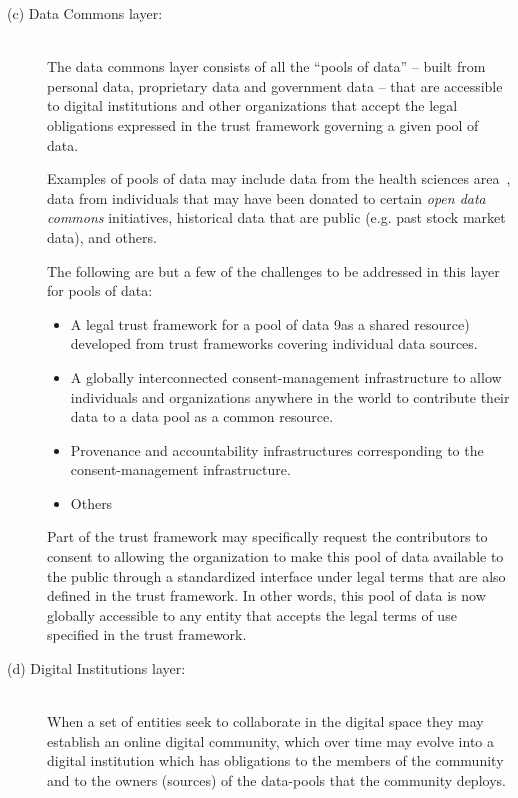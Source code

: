 \begin{description}
\item[(c) Data Commons layer:]~\\
The data commons layer consists of all the ``pools of data''
-- built from personal data, proprietary data and government data --
that are accessible to digital institutions and
other organizations that accept the legal obligations
expressed in the trust framework governing a given pool of data.

Examples of pools of data may include data from the health sciences area~\cite{pentland2009using},
data from individuals that may have been donated
to certain {\em open data commons} initiatives,
historical data that are public (e.g. past stock market data),
and others.

The following are but a few of the challenges to be addressed
in this layer for pools of data:
\begin{itemize}
\item  A legal trust framework for a pool of data 9as a shared resource) developed
from trust frameworks covering individual data sources.

\item  A globally interconnected consent-management infrastructure
to allow individuals and organizations anywhere in the world
to contribute their data to a data pool as a common resource.

\item  Provenance and accountability infrastructures corresponding 
to the consent-management infrastructure.

\item  Others
\end{itemize}


Part of the trust framework may specifically
request the contributors to consent
to allowing the organization
to make this pool of data available to the public
through a standardized interface
under legal terms that are also defined in the
trust framework.
In other words, this pool of data
is now globally accessible to any entity
that accepts the legal terms of use specified
in the trust framework.



\item[(d) Digital Institutions layer:]~\\
When a set of entities seek to collaborate in the digital space
they may establish an online digital community,
which over time may evolve into 
a digital institution
which has obligations
to the members of the community and
to the owners (sources) of the data-pools that the community deploys.


\end{description}
